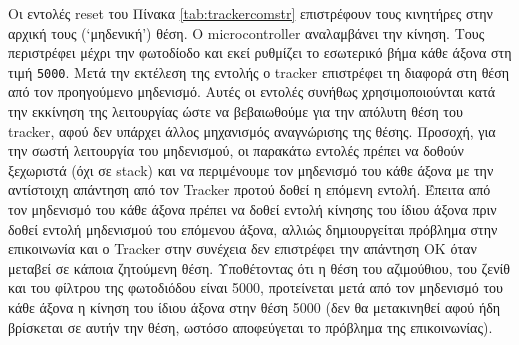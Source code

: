\documentclass[
  a4paper,
  twoside,
  titlepage,
  12pt]{article}
\numberwithin{equation}{section}
\numberwithin{figure}{section}
\numberwithin{table}{section}
\begin{document}
Οι εντολές reset του Πίνακα \ref{tab:trackercomstr} επιστρέφουν τους κινητήρες στην αρχική τους (`μηδενική') θέση.
Ο microcontroller αναλαμβάνει την κίνηση. Τους περιστρέφει μέχρι την φωτοδίοδο και εκεί ρυθμίζει το εσωτερικό βήμα κάθε άξονα στη τιμή \texttt{5000}.
Μετά την εκτέλεση της εντολής ο tracker επιστρέφει τη διαφορά στη θέση από τον προηγούμενο μηδενισμό. Αυτές οι εντολές συνήθως χρησιμοποιούνται κατά την εκκίνηση της λειτουργίας ώστε να βεβαιωθούμε για την απόλυτη θέση του tracker, αφού δεν υπάρχει άλλος μηχανισμός αναγνώρισης της θέσης.
Προσοχή, για την σωστή λειτουργία του μηδενισμού, οι παρακάτω εντολές πρέπει να δοθούν ξεχωριστά (όχι σε stack) και να περιμένουμε τον μηδενισμό του κάθε άξονα με την αντίστοιχη απάντηση από τον Tracker προτού δοθεί η επόμενη εντολή. Έπειτα από τον μηδενισμό του κάθε άξονα πρέπει να δοθεί εντολή κίνησης του ίδιου άξονα πριν δοθεί εντολή μηδενισμού του επόμενου άξονα, αλλιώς δημιουργείται πρόβλημα στην επικοινωνία και ο Tracker στην συνέχεια δεν επιστρέφει την απάντηση OK όταν μεταβεί σε κάποια ζητούμενη θέση. Υποθέτοντας ότι η θέση του αζιμούθιου, του ζενίθ και του φίλτρου της φωτοδιόδου είναι 5000, προτείνεται μετά από τον μηδενισμό του κάθε άξονα η κίνηση του ίδιου άξονα στην θέση 5000 (δεν θα μετακινηθεί αφού ήδη βρίσκεται σε αυτήν την θέση, ωστόσο αποφεύγεται το πρόβλημα της επικοινωνίας).

\footnotesize
\end{document}
